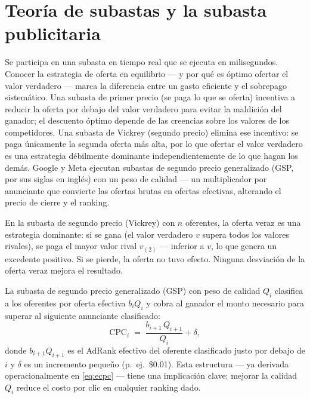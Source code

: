 \section{Teoría de subastas y la subasta publicitaria}\label{sec:auction-theory}

Se participa en una subasta en tiempo real que se ejecuta en milisegundos. Conocer la estrategia
de oferta en equilibrio --- y por qué es óptimo ofertar el valor verdadero --- marca la diferencia
entre un gasto eficiente y el sobrepago sistemático. Una subasta de primer precio (se paga lo que
se oferta) incentiva a reducir la oferta por debajo del valor verdadero para evitar la maldición
del ganador; el descuento óptimo depende de las creencias sobre los valores de los competidores.
Una subasta de Vickrey (segundo precio) elimina ese incentivo: se paga únicamente la segunda oferta
más alta, por lo que ofertar el valor verdadero es una estrategia débilmente dominante
independientemente de lo que hagan los demás. Google y Meta ejecutan subastas de segundo precio
generalizado (GSP, por sus siglas en inglés) con un peso de calidad --- un multiplicador por
anunciante que convierte las ofertas brutas en ofertas efectivas, alterando el precio de cierre
y el ranking.

En la subasta de segundo precio (Vickrey) con \(n\) oferentes, la oferta veraz es una estrategia
dominante: si se gana (el valor verdadero \(v\) supera todos los valores rivales), se paga el
mayor valor rival \(v_{(2)}\) --- inferior a \(v\), lo que genera un excedente positivo. Si se
pierde, la oferta no tuvo efecto. Ninguna desviación de la oferta veraz mejora el resultado.

La subasta de segundo precio generalizado (GSP) con peso de calidad \(Q_i\) clasifica a los
oferentes por oferta efectiva \(b_i Q_i\) y cobra al ganador el monto necesario para superar al
siguiente anunciante clasificado:
\begin{equation}\label{eq:gsp}
  \mathrm{CPC}_i \;=\; \frac{b_{i+1}\,Q_{i+1}}{Q_i} + \delta,
\end{equation}
donde \(b_{i+1}Q_{i+1}\) es el AdRank efectivo del oferente clasificado justo por debajo de \(i\)
y \(\delta\) es un incremento pequeño (p.\ ej.\ \$0.01). Esta estructura --- ya derivada
operacionalmente en \cref{eq:ecpc} --- tiene una implicación clave: mejorar la calidad \(Q_i\)
reduce el costo por clic en cualquier ranking dado.


